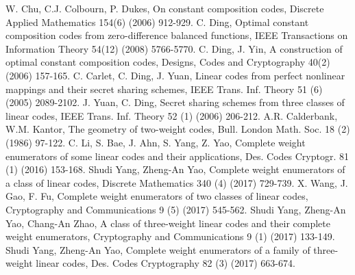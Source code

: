 \documentclass[final,1p,times]{elsarticle}
\begin{document}
\begin{thebibliography}{99}
  W. Chu, C.J. Colbourn, P. Dukes,  On constant composition codes, Discrete Applied Mathematics 154(6) (2006) 912-929. 
  C. Ding, Optimal constant composition codes from zero-difference balanced functions, IEEE Transactions on Information Theory 54(12) (2008) 5766-5770. 
  C. Ding, J. Yin, A construction of optimal constant composition codes, Designs, Codes and Cryptography 40(2) (2006) 157-165.
  C. Carlet, C. Ding,  J. Yuan, Linear codes from perfect nonlinear mappings and their secret sharing schemes, IEEE Trans. Inf. Theory 51 (6) (2005) 2089-2102.
  J. Yuan, C. Ding, Secret sharing schemes from three classes of linear codes, IEEE Trans. Inf. Theory 52 (1) (2006) 206-212.
 A.R. Calderbank, W.M. Kantor, The geometry of two-weight codes, Bull. London Math. Soc. 18 (2) (1986) 97-122.
 C. Li, S. Bae, J. Ahn, S. Yang, Z. Yao, Complete weight enumerators of some linear codes and their applications, Des. Codes Cryptogr. 81 (1) (2016)  153-168.
 Shudi Yang, Zheng-An Yao, Complete weight enumerators of a class of linear codes, Discrete Mathematics 340 (4) (2017) 729-739.
 X. Wang, J. Gao, F. Fu, Complete weight enumerators of two classes of linear codes, Cryptography and Communications 9 (5) (2017) 545-562.
 Shudi Yang, Zheng-An Yao, Chang-An Zhao, A class of three-weight linear codes and their complete weight enumerators, Cryptography and Communications 9 (1) (2017) 133-149. 
 Shudi Yang, Zheng-An Yao, Complete weight enumerators of a family of three-weight linear codes, Des. Codes Cryptography 82 (3) (2017) 663-674.
  \end{thebibliography}
  
\end{document}
